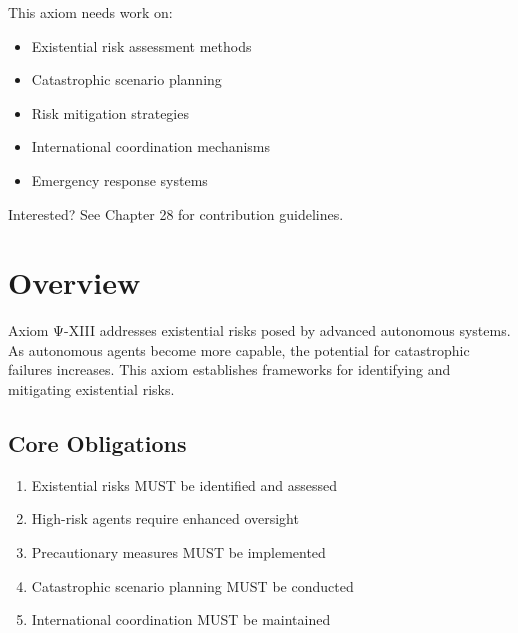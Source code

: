 \begin{tcolorbox}[colback=lightgray, colframe=accentgold, title=\textbf{🎯 Contribution Opportunity}]
This axiom needs work on:
\begin{itemize}
    \item Existential risk assessment methods
    \item Catastrophic scenario planning
    \item Risk mitigation strategies
    \item International coordination mechanisms
    \item Emergency response systems
\end{itemize}

Interested? See Chapter 28 for contribution guidelines.
\end{tcolorbox}

\vspace{0.5cm}

\section{Overview}

Axiom Ψ-XIII addresses existential risks posed by advanced autonomous systems. As autonomous agents become more capable, the potential for catastrophic failures increases. This axiom establishes frameworks for identifying and mitigating existential risks.

\subsection{Core Obligations}

\begin{enumerate}
    \item Existential risks MUST be identified and assessed
    \item High-risk agents require enhanced oversight
    \item Precautionary measures MUST be implemented
    \item Catastrophic scenario planning MUST be conducted
    \item International coordination MUST be maintained
\end{enumerate}

\vspace{0.5cm}

